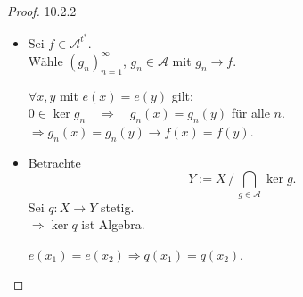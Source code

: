 
\begin{proof}{10.2.2}
    \begin{itemize}
        \item[" $\subseteq$":] Sei $f \in \mathcal{A}^{t^*}$. \\
    Wähle $(g_n)_{n=1}^\infty$, $g_n \in \mathcal{A}$ mit $g_n \to f$.

    $\forall x,y$ mit $e(x) = e(y)$ gilt:\\
    $0 \in \ker g_n \quad\Rightarrow\quad g_n(x) = g_n(y)$  für alle $n$.\\
    $\Rightarrow g_n(x) = g_n(y) \to f(x) = f(y)$.
        \item[“$\supseteq$”] Betrachte 
    $$
        Y := X \,\big/\, \bigcap_{g \in \mathcal{A}} \ker g.
    $$
    Sei $q : X \to Y$ stetig.\\
    $\Rightarrow \ker q$ ist Algebra.

    $e(x_1) = e(x_2) \Rightarrow q(x_1) = q(x_2)$.
    \end{itemize}
\end{proof}